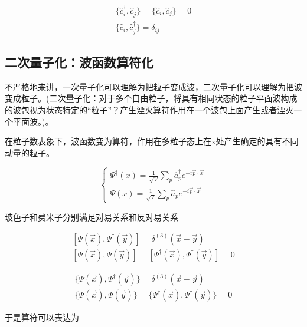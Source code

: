 \begin{equation}
    \begin{split}
        \{\hat{c}_i^\dagger,\hat{c}_j^\dagger\}=\{\hat{c}_i,\hat{c}_j\}=0 \\
        \{\hat{c}_i,\hat{c}_j^\dagger\}=\delta_{ij}
    \end{split}
\end{equation}



\subsection{二次量子化：波函数算符化}

不严格地来讲，一次量子化可以理解为把粒子变成波，二次量子化可以理解为把波变成粒子。(二次量子化：对于多个自由粒子，将具有相同状态的粒子平面波构成的波包视为状态特定的“粒子”？产生湮灭算符作用在一个波包上面产生或者湮灭一个平面波。)。

在粒子数表象下，波函数变为算符，作用在多粒子态上在x处产生确定的具有不同动量的粒子。

\begin{equation}
	\left\{
	\begin{array}{lr}
		\Psi^\dagger(x)=\frac{1}{\sqrt{V}}\sum_{p}\hat{a}_p^\dagger e^{-i\vec{p}\cdot\vec{x}} \\
		\Psi(x)=\frac{1}{\sqrt{V}}\sum_{p}\hat{a}_pe^{-i\vec{p}\cdot\vec{x}}
	\end{array}
	\right.
\end{equation}

玻色子和费米子分别满足对易关系和反对易关系

\begin{equation}
	\begin{split}
		[\Psi(\vec{x}),\Psi^\dagger(\vec{y})]=\delta^{(3)}(\vec{x}-\vec{y}) \\
		[\Psi(\vec{x}),\Psi(\vec{y})]=[\Psi^\dagger(\vec{x}),\Psi^\dagger(\vec{y})]=0
	\end{split}
\end{equation}

\begin{equation}
	\begin{array}{lr}
		\{\Psi(\vec{x}),\Psi^\dagger(\vec{y})\}=\delta^{(3)}(\vec{x}-\vec{y}) \\
		\{\Psi(\vec{x}),\Psi(\vec{y})\}=\{\Psi^\dagger(\vec{x}),\Psi^\dagger(\vec{y})\}=0
	\end{array}
\end{equation}

于是算符可以表达为

